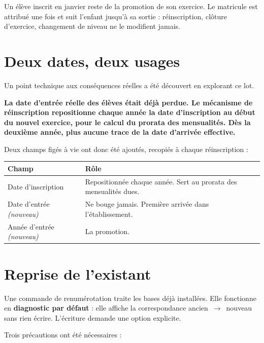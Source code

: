 \documentclass[11pt,a4paper]{report}
\newcommand{\encadre}[2]{%
  \begingroup
  \setlength{\fboxsep}{9pt}%
  \noindent\colorbox{sagibg}{%
    \begin{minipage}{\dimexpr\linewidth-2\fboxsep\relax}
    \textbf{\color{#1}#2}
    \end{minipage}}%
  \par\vspace{8pt}
  \endgroup}
\newcommand{\alerte}[1]{\encadre{sagired}{#1}}
\begin{document}
Un élève inscrit en janvier reste de la promotion de son exercice. Le matricule
est attribué une fois et suit l'enfant jusqu'à sa sortie : réinscription,
clôture d'exercice, changement de niveau ne le modifient jamais.

\section{Deux dates, deux usages}

Un point technique aux conséquences réelles a été découvert en explorant ce
lot.

\alerte{La date d'entrée réelle des élèves était déjà perdue. Le mécanisme de
réinscription repositionne chaque année la date d'inscription au début du
nouvel exercice, pour le calcul du prorata des mensualités. Dès la deuxième
année, plus aucune trace de la date d'arrivée effective.}

Deux champs figés à vie ont donc été ajoutés, recopiés à chaque
réinscription :

\begin{center}
\begin{tabularx}{\linewidth}{@{}p{4.5cm}X@{}}
\toprule
\textbf{Champ} & \textbf{Rôle} \\
\midrule
Date d'inscription & Repositionnée chaque année. Sert au prorata des
  mensualités dues. \\
Date d'entrée \emph{(nouveau)} & Ne bouge jamais. Première arrivée dans
  l'établissement. \\
Année d'entrée \emph{(nouveau)} & La promotion. \\
\bottomrule
\end{tabularx}
\end{center}

\section{Reprise de l'existant}

Une commande de renumérotation traite les bases déjà installées. Elle
fonctionne en \textbf{diagnostic par défaut} : elle affiche la correspondance
ancien~$\rightarrow$~nouveau sans rien écrire. L'écriture demande une option
explicite.

Trois précautions ont été nécessaires :
\end{document}
